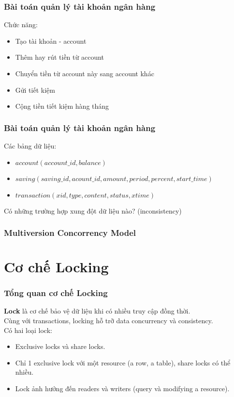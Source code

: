 \documentclass[xcolor={table, dvipsnames}]{beamer}
\begin{document}
\begin{frame}
\frametitle{Bài toán quản lý tài khoản ngân hàng}
Chức năng:
\begin{itemize}
\item Tạo tài khoản - account
\item Thêm hay rút tiền từ account
\item Chuyển tiền từ account này sang account khác
\item Gửi tiết kiệm
\item Cộng tiền tiết kiệm hàng tháng
\end{itemize}
\end{frame}

\begin{frame}
\frametitle{Bài toán quản lý tài khoản ngân hàng}
Các bảng dữ liệu:
\begin{itemize}
\item $account(account\_id, balance)$
\item $saving(saving\_id, acount\_id, amount, period, percent, start\_time)$
\item $transaction(xid, type, content, status, xtime)$
\end{itemize}
Có những trường hợp xung đột dữ liệu nào? (inconsistency)
\end{frame}

\begin{frame}
\frametitle{Multiversion Concorrency Model}

\end{frame}

\section{Cơ chế Locking}

\begin{frame}
\frametitle{Tổng quan cơ chế Locking}
\textbf{Lock} là cơ chế bảo vệ dữ liệu khi có nhiều truy cập đồng thời.\\
Cùng với transactions, locking hỗ trỡ data concurrency và consistency.\\
\pause
Có hai loại lock:
\begin{itemize}
\item Exclusive locks và share locks.
\item Chỉ 1 exclusive lock với một resource (a row, a table), share locks có thể nhiều.
\item Lock ảnh hưởng đến readers và writers (query và modifying a resource).
\end{itemize}
\end{frame}
\end{document}
